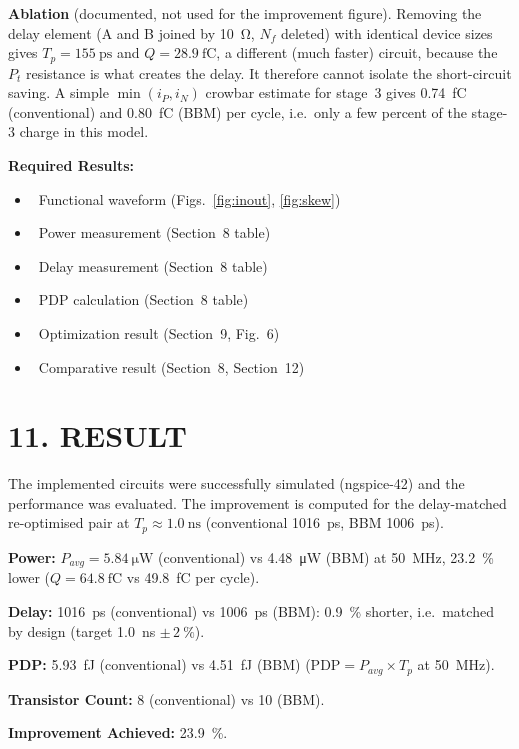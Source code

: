 \documentclass[11pt,a4paper]{article}
\newcommand{\sect}[1]{\section*{#1}}
\begin{document}
\textbf{Ablation} (documented, not used for the improvement figure). Removing the delay element (A and B joined by \SI{10}{\ohm}, $N_f$ deleted) with identical device sizes gives $T_p=\SI{155}{\pico\second}$ and $Q=\SI{28.9}{\femto\coulomb}$, a different (much faster) circuit, because the $P_t$ resistance is what creates the delay. It therefore cannot isolate the short-circuit saving. A simple $\min(i_P,i_N)$ crowbar estimate for stage~3 gives \SI{0.74}{\femto\coulomb} (conventional) and \SI{0.80}{\femto\coulomb} (BBM) per cycle, i.e.\ only a few percent of the stage-3 charge in this model.

\textbf{Required Results:}
\begin{itemize}[label={},leftmargin=1.2em,nosep]
  \item {}\ Functional waveform (Figs.~\ref{fig:inout}, \ref{fig:skew})
  \item {}\ Power measurement (Section~8 table)
  \item {}\ Delay measurement (Section~8 table)
  \item {}\ PDP calculation (Section~8 table)
  \item {}\ Optimization result (Section~9, Fig.~6)
  \item {}\ Comparative result (Section~8, Section~12)
\end{itemize}

\sect{11. RESULT}
The implemented circuits were successfully simulated (ngspice-42) and the performance was evaluated. The improvement is computed for the delay-matched re-optimised pair at $T_p\approx\SI{1.0}{\nano\second}$ (conventional \SI{1016}{\pico\second}, BBM \SI{1006}{\pico\second}).

\textbf{Power:} $P_{avg}=\SI{5.84}{\micro\watt}$ (conventional) vs \SI{4.48}{\micro\watt} (BBM) at \SI{50}{\mega\hertz}, \SI{23.2}{\percent} lower ($Q=\SI{64.8}{\femto\coulomb}$ vs \SI{49.8}{\femto\coulomb} per cycle).

\textbf{Delay:} \SI{1016}{\pico\second} (conventional) vs \SI{1006}{\pico\second} (BBM): \SI{0.9}{\percent} shorter, i.e.\ matched by design (target \SI{1.0}{\nano\second} $\pm\,\SI{2}{\percent}$).

\textbf{PDP:} \SI{5.93}{\femto\joule} (conventional) vs \SI{4.51}{\femto\joule} (BBM) ($\mathrm{PDP}=P_{avg}\times T_p$ at \SI{50}{\mega\hertz}).

\textbf{Transistor Count:} 8 (conventional) vs 10 (BBM).

\textbf{Improvement Achieved:} \SI{23.9}{\percent}\quad [$=(5.927-4.511)/5.927\times 100$, from the logged PDP values].
\end{document}
